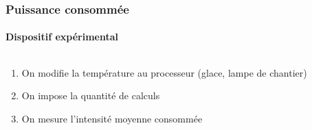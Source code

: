 \documentclass[a4paper,11pt]{beamer}
\begin{document}
\begin{frame}
    \frametitle{Puissance consommée}
    \framesubtitle{Dispositif expérimental}

    \begin{columns}
        \begin{column}{0.5\textwidth}
            \begin{enumerate}
                \item On modifie la température au processeur (glace, lampe de chantier)
                \item On impose la quantité de calculs
                \item On mesure l'intensité moyenne consommée
            \end{enumerate}
        \end{column}
        \begin{column}{0.5\textwidth}
        \end{column}
    \end{columns}
\end{frame}
\end{document}
